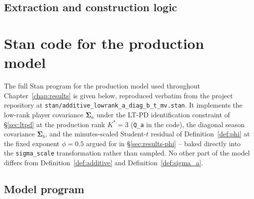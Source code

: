 \documentclass{fmetfm}
\begin{document}
\section{Extraction and construction logic}



\chapter{Stan code for the production model}
\label{app:stan}

The full Stan program for the production model used throughout Chapter~\ref{chap:results} is given below,
reproduced verbatim from the project repository at
\texttt{stan/additive\_lowrank\_a\_diag\_b\_t\_mv.stan}. It implements the low-rank player covariance
$\boldsymbol\Sigma_a$ under the LT-PD identification constraint of \S\ref{sec:ltpd} at the production rank
$K^*=3$ (\texttt{Q\_a} in the code), the diagonal season covariance $\boldsymbol\Sigma_b$, and the
minutes-scaled Student-$t$ residual of Definition~\ref{def:phi} at the fixed exponent $\phi=0.5$ argued for in
\S\ref{sec:results-phi} -- baked directly into the \texttt{sigma\_scale} transformation rather than sampled.
No other part of the model differs from Definition~\ref{def:additive} and Definition~\ref{def:sigma_a}.

\section{Model program}






\end{document}
